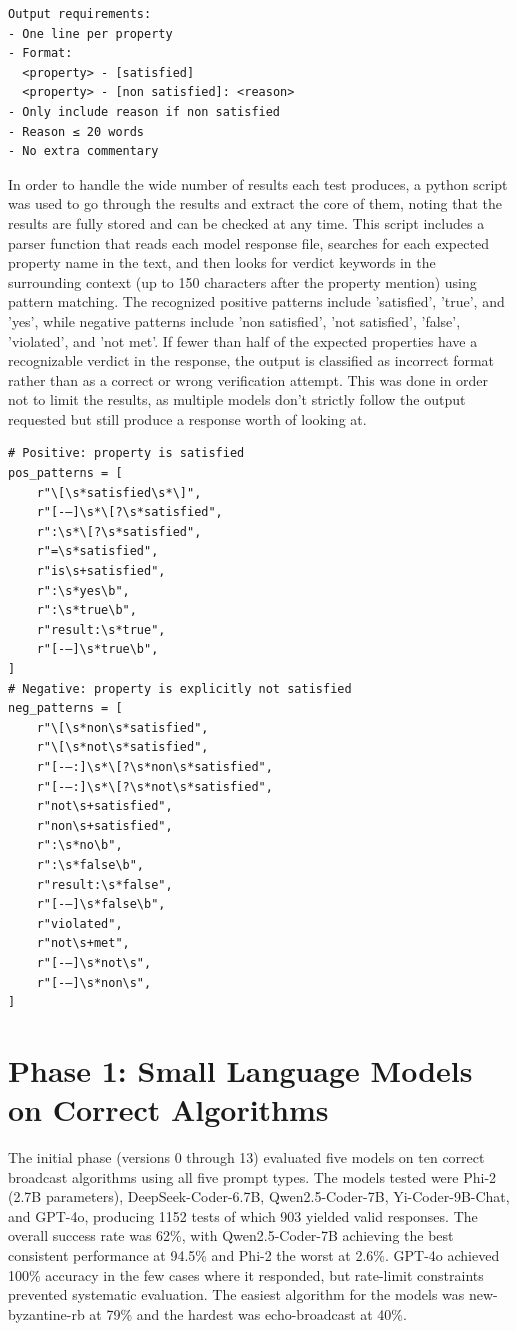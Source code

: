 \documentclass[conference]{IEEEtran}
\begin{document}
\begin{verbatim}
Output requirements:
- One line per property
- Format:
  <property> - [satisfied]
  <property> - [non satisfied]: <reason>
- Only include reason if non satisfied
- Reason ≤ 20 words
- No extra commentary
\end{verbatim}

In order to handle the wide number of results each test produces, a python script was used to go through the results and extract the core of them, noting that the results are fully stored and can be checked at any time. This script includes a parser function that reads each model response file, searches for each expected property name in the text, and then looks for verdict keywords in the surrounding context (up to 150 characters after the property mention) using pattern matching. The recognized positive patterns include 'satisfied', 'true', and 'yes', while negative patterns include 'non satisfied', 'not satisfied', 'false', 'violated', and 'not met'. If fewer than half of the expected properties have a recognizable verdict in the response, the output is classified as incorrect format rather than as a correct or wrong verification attempt. This was done in order not to limit the results, as multiple models don't strictly follow the output requested but still produce a response worth of looking at.

\begin{verbatim}
# Positive: property is satisfied
pos_patterns = [
    r"\[\s*satisfied\s*\]",
    r"[-–]\s*\[?\s*satisfied",  
    r":\s*\[?\s*satisfied",     
    r"=\s*satisfied",          
    r"is\s+satisfied",       
    r":\s*yes\b",                
    r":\s*true\b",        
    r"result:\s*true",           
    r"[-–]\s*true\b",          
]
# Negative: property is explicitly not satisfied
neg_patterns = [
    r"\[\s*non\s*satisfied",     
    r"\[\s*not\s*satisfied",   
    r"[-–:]\s*\[?\s*non\s*satisfied",
    r"[-–:]\s*\[?\s*not\s*satisfied",
    r"not\s+satisfied",
    r"non\s+satisfied",
    r":\s*no\b",
    r":\s*false\b",
    r"result:\s*false",
    r"[-–]\s*false\b",
    r"violated",
    r"not\s+met",
    r"[-–]\s*not\s",
    r"[-–]\s*non\s",
]
\end{verbatim}

\section{Phase 1: Small Language Models on Correct Algorithms}

The initial phase (versions 0 through 13) evaluated five models on ten correct broadcast algorithms using all five prompt types. The models tested were Phi-2 (2.7B parameters), DeepSeek-Coder-6.7B, Qwen2.5-Coder-7B, Yi-Coder-9B-Chat, and GPT-4o, producing 1152 tests of which 903 yielded valid responses. The overall success rate was 62\%, with Qwen2.5-Coder-7B achieving the best consistent performance at 94.5\% and Phi-2 the worst at 2.6\%. GPT-4o achieved 100\% accuracy in the few cases where it responded, but rate-limit constraints prevented systematic evaluation. The easiest algorithm for the models was new-byzantine-rb at 79\% and the hardest was echo-broadcast at 40\%.
\end{document}
